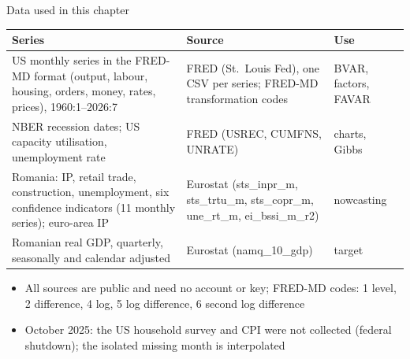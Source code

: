\begin{frame}{Data used in this chapter}
\itemsize{\footnotesize}
\begin{center}
\scriptsize
\begin{tabular}{>{\raggedright\arraybackslash}p{5.0cm}>{\raggedright\arraybackslash}p{4.6cm}>{\raggedright\arraybackslash}p{2.4cm}}
\toprule
\textbf{Series} & \textbf{Source} & \textbf{Use} \\
\midrule
117 US monthly series in the FRED-MD format (output, labour, housing, orders, money, rates, prices), 1960:1--2026:7 & FRED (St.~Louis Fed), one CSV per series; FRED-MD transformation codes {} & BVAR, factors, FAVAR \\
NBER recession dates; US capacity utilisation, unemployment rate & FRED (USREC, CUMFNS, UNRATE) & charts, Gibbs \\
Romania: IP, retail trade, construction, unemployment, six confidence indicators (11 monthly series); euro-area IP & Eurostat (sts\_inpr\_m, sts\_trtu\_m, sts\_copr\_m, une\_rt\_m, ei\_bssi\_m\_r2) & nowcasting \\
Romanian real GDP, quarterly, seasonally and calendar adjusted & Eurostat (namq\_10\_gdp) & target \\
\bottomrule
\end{tabular}
\end{center}
\begin{itemize}
    \item All sources are public and need no account or key; FRED-MD codes: 1 level, 2 difference, 4 log, 5 log difference, 6 second log difference
    \item October 2025: the US household survey and CPI were not collected (federal shutdown); the isolated missing month is interpolated
\end{itemize}
\end{frame}

